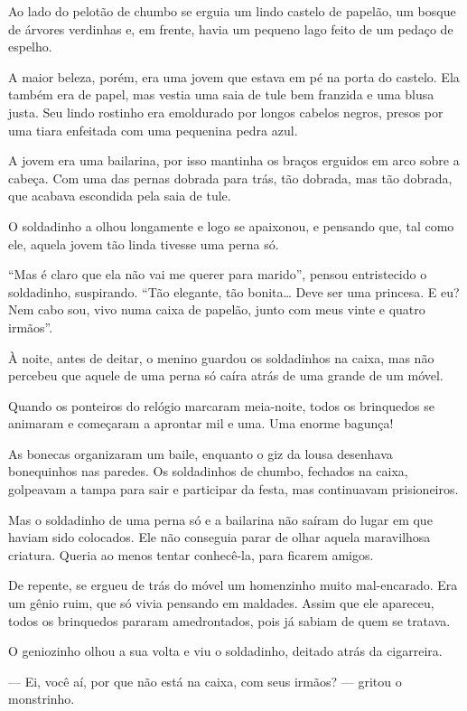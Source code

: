 \begin{myquote}
Ao lado do pelotão de chumbo se erguia um lindo castelo de papelão, um
bosque de árvores verdinhas e, em frente, havia um pequeno lago feito de
um pedaço de espelho.

A maior beleza, porém, era uma jovem que estava em pé na porta do
castelo. Ela também era de papel, mas vestia uma saia de tule bem
franzida e uma blusa justa. Seu lindo rostinho era emoldurado por
longos cabelos negros, presos por uma tiara enfeitada com uma pequenina
pedra azul.

A jovem era uma bailarina, por isso mantinha os braços erguidos
em arco sobre a cabeça. Com uma das pernas dobrada para trás, tão
dobrada, mas tão dobrada, que acabava escondida pela saia de tule.

O soldadinho a olhou longamente e logo se apaixonou, e pensando que, tal
como ele, aquela jovem tão linda tivesse uma perna só.

``Mas é claro que ela não vai me querer para marido'', pensou
entristecido o soldadinho, suspirando. ``Tão elegante, tão
bonita\ldots{} Deve ser uma princesa. E eu? Nem cabo sou, vivo numa
caixa de papelão, junto com meus vinte e quatro irmãos''.

À noite, antes de deitar, o menino guardou os soldadinhos na caixa, mas
não percebeu que aquele de uma perna só caíra atrás de uma grande de um móvel.

Quando os ponteiros do relógio marcaram meia-noite, todos os brinquedos
se animaram e começaram a aprontar mil e uma. Uma enorme bagunça!

As bonecas organizaram um baile, enquanto o giz da lousa desenhava
bonequinhos nas paredes. Os soldadinhos de chumbo, fechados na caixa,
golpeavam a tampa para sair e participar da festa, mas continuavam prisioneiros.

Mas o soldadinho de uma perna só e a bailarina não saíram do lugar em
que haviam sido colocados. Ele não conseguia parar de olhar aquela
maravilhosa criatura. Queria ao menos tentar conhecê-la, para ficarem
amigos.

De repente, se ergueu de trás do móvel um homenzinho muito mal-encarado.
Era um gênio ruim, que só vivia pensando em maldades. Assim que ele
apareceu, todos os brinquedos pararam amedrontados, pois já sabiam de
quem se tratava.

O geniozinho olhou a sua volta e viu o soldadinho, deitado atrás da
cigarreira.

--- Ei, você aí, por que não está na caixa, com seus irmãos? --- gritou
o monstrinho.


\end{myquote}
